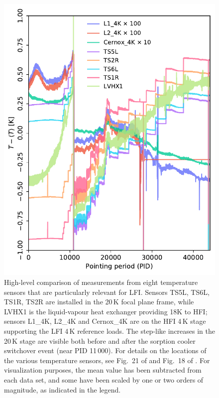 \documentclass[twocolumn]{aa}
\begin{document}
\begin{figure}
  \begin{center}
    \includegraphics[width=\linewidth]{figs/hk_all.pdf}
  \end{center}
  \caption{High-level comparison of measurements from eight
    temperature sensors that are particularly relevant for
    LFI. Sensors TS5L, TS6L, TS1R, TS2R are installed in the 20\,K
    focal plane frame, while LVHX1 is the liquid-vapour heat exchanger
    providing 18K to HFI; sensors L1\_4K, L2\_4K and Cernox\_4K are on
    the HFI 4\,K stage supporting the LFI 4\,K reference loads. The
    step-like increases in the 20\,K stage are visible both before and
    after the sorption cooler switchover event (near PID 11\,000).
    For
    details on the locations of the various temperature sensors, see Fig.~21
    of \citet{bersanelli2010} and Fig.~18 of \citet{lamarre2010}. For
    visualization purposes, the mean value has been subtracted from
    each data set, and some have been scaled by one or two orders of
    magnitude, as indicated in the legend. 
    \label{fig:hk_all}}
\end{figure}
\end{document}
